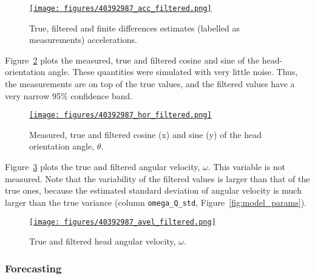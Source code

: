 \documentclass[12pt]{article}
\begin{document}
\begin{figure}
    \centering
    \href{https://www.gatsby.ucl.ac.uk/~rapela/aman/reports/ekfForKinematicsAndHeadOrientation/figures/40392987_acc_filtered.html}{\texttt{[image: figures/40392987\_acc\_filtered.png]}}

    \caption{True, filtered and finite differences estimates
    (labelled as measurements) accelerations.}

    \label{fig:sim_filtered_acc}
\end{figure}

Figure~\ref{fig:sim_filtered_hor} plots the measured, true and filtered cosine
and sine of the head-orientation angle. These quantities were simulated with
very little noise. Thus, the measurements are on top of the true values, and
the filtered values have a very narrow 95\% confidence band.

\begin{figure}
    \centering
    \href{https://www.gatsby.ucl.ac.uk/~rapela/aman/reports/ekfForKinematicsAndHeadOrientation/figures/40392987_hor_filtered.html}{\texttt{[image: figures/40392987\_hor\_filtered.png]}}

    \caption{Measured, true and filtered cosine (x) and sine (y) of the head
    orientation angle, $\theta$.}

    \label{fig:sim_filtered_hor}
\end{figure}

Figure~\ref{fig:sim_filtered_avel} plots the true and filtered angular
velocity, $\omega$. This variable is not measured. Note that the variability of the
filtered values is larger than that of the true ones, because the estimated
standard deviation of angular velocity is much larger than the true variance
(column \texttt{omega\_Q\_std}, Figure~\ref{fig:model_params}).

\begin{figure}
    \centering
    \href{https://www.gatsby.ucl.ac.uk/~rapela/aman/reports/ekfForKinematicsAndHeadOrientation/figures/40392987_avel_filtered.html}{\texttt{[image: figures/40392987\_avel\_filtered.png]}}

    \caption{True and filtered head angular velocity, $\omega$.}

    \label{fig:sim_filtered_avel}
\end{figure}

\subsubsection*{Forecasting}
\end{document}

